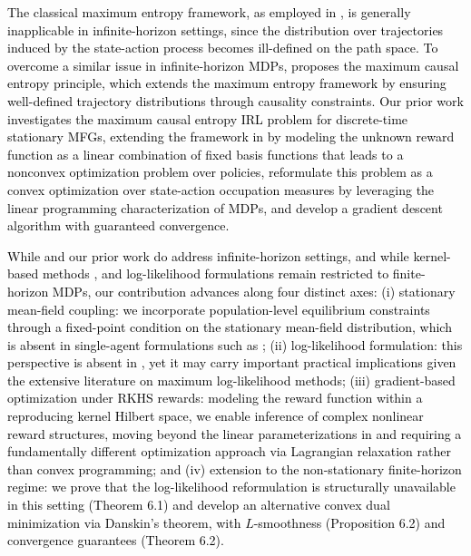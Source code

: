 \documentclass[11pt]{article}
\newcommand{\tv}[1]{\textcolor{black}{#1}} %
\newcommand{\tb}[1]{\textcolor{black}{#1}} %
\begin{document}

\tb{The classical maximum entropy framework, as employed in \cite{ChZhLiWi23}, is generally inapplicable in infinite-horizon settings, since the distribution over trajectories induced by the state-action process becomes ill-defined on the path space. To overcome a similar issue in infinite-horizon MDPs, \cite{ZhBlBa18} proposes the maximum causal entropy principle, which extends the maximum entropy framework by ensuring well-defined trajectory distributions through causality constraints.} \tv{Our prior work \cite{AnKaSa25} investigates the maximum causal entropy IRL problem for discrete-time stationary MFGs, extending the framework in \cite{ZhBlBa18} by modeling the unknown reward function as a linear combination of fixed basis functions that leads to a nonconvex optimization problem over policies, reformulate this problem as a convex optimization over state-action occupation measures by leveraging the linear programming characterization of MDPs, and develop a gradient descent algorithm with guaranteed convergence.}

\tb{While \cite{LinAB19} and our prior work \cite{AnKaSa25} do address infinite-horizon settings, and while kernel-based methods \cite{TaylorP09}, \cite{vakili2024kernelbased} and log-likelihood formulations \cite{GlTo22, ZiBaDe10, ZiBaDe13} remain restricted to finite-horizon MDPs, our contribution advances along four distinct axes: (i) stationary mean-field coupling: we incorporate population-level equilibrium constraints through a fixed-point condition on the stationary mean-field distribution, which is absent in single-agent formulations such as \cite{ZhBlBa18}; (ii) log-likelihood formulation: this perspective is absent in \cite{LinAB19,ZhBlBa18,AnKaSa25}, yet it may carry important practical implications given the extensive literature on maximum log-likelihood methods; (iii) gradient-based optimization under RKHS rewards: modeling the reward function within a reproducing kernel Hilbert space, we enable inference of complex nonlinear reward structures, moving beyond the linear parameterizations in \cite{AnKaSa25} and requiring a fundamentally different optimization approach via Lagrangian relaxation rather than convex programming; and (iv) extension to the non-stationary finite-horizon regime: we prove that the log-likelihood reformulation is structurally unavailable in this setting (Theorem 6.1) and develop an alternative convex dual minimization via Danskin's theorem, with $L$-smoothness (Proposition 6.2) and convergence guarantees (Theorem 6.2).}
\end{document}
